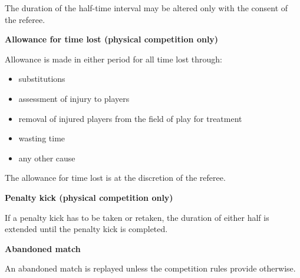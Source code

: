 The duration of the half-time interval may be altered only with the consent of the referee.

\bigskip

{\bfseries Allowance for time lost (physical competition only)}

\headlinebox

Allowance is made in either period for all time lost through:

\begin{itemize}
\item substitutions
\item assessment of injury to players
\item removal of injured players from the field of play for treatment
\item wasting time
\item any other cause
\end{itemize}

The allowance for time lost is at the discretion of the referee.

\bigskip

{\bfseries Penalty kick (physical competition only)}

\headlinebox

If a penalty kick has to be taken or retaken, the duration of either half is extended until the penalty kick is completed.

\bigskip

{\sffamily
\textbf{Abandoned match} }

\headlinebox

An abandoned match is replayed unless the competition rules provide otherwise.
